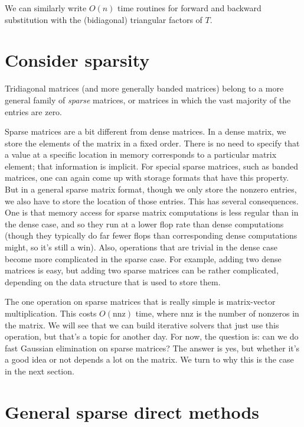 \documentclass[12pt, leqno]{article}
\begin{document}
We can similarly write $O(n)$ time routines for forward and backward
substitution with the (bidiagonal) triangular factors of $T$.

\section*{Consider sparsity}

Tridiagonal matrices (and more generally banded matrices) belong to
a more general family of {\em sparse} matrices, or matrices in which
the vast majority of the entries are zero.

Sparse matrices are a bit different from dense matrices.  In a dense
matrix, we store the elements of the matrix in a fixed order.  There
is no need to specify that a value at a specific location in memory
corresponds to a particular matrix element; that information is
implicit.  For special sparse matrices, such as banded matrices, one
can again come up with storage formats that have this property.  But
in a general sparse matrix format, though we only store the nonzero
entries, we also have to store the location of those entries.  This
has several consequences.  One is that memory access for sparse matrix
computations is less regular than in the dense case, and so they run
at a lower flop rate than dense computations (though they typically do
far fewer flops than corresponding dense computations might, so it's
still a win).  Also, operations that are trivial in the dense case
become more complicated in the sparse case.  For example, adding two
dense matrices is easy, but adding two sparse matrices can be rather
complicated, depending on the data structure that is used to store
them.

The one operation on sparse matrices that is really simple is
matrix-vector multiplication.  This costs $O(\mathrm{nnz})$ time,
where nnz is the number of nonzeros in the matrix.  We will see that
we can build iterative solvers that just use this operation, but
that's a topic for another day.  For now, the question is: can we do
fast Gaussian elimination on sparse matrices?  The answer is yes,
but whether it's a good idea or not depends a lot on the matrix.
We turn to why this is the case in the next section.

\section*{General sparse direct methods}
\end{document}
